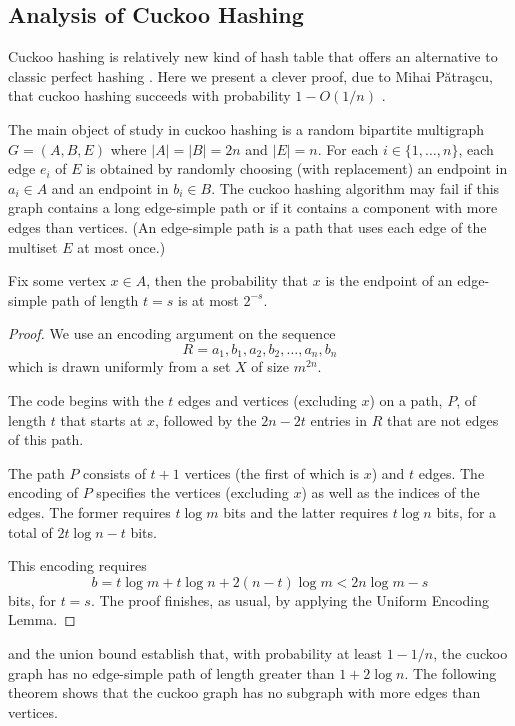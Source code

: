 \documentclass{patmorin}
\begin{document}
\subsection{Analysis of Cuckoo Hashing}

Cuckoo hashing is relatively new kind of hash table that offers an
alternative to classic perfect hashing \cite{pagh.rodler:cuckoo}. Here we present a clever proof,
due to Mihai Pătraşcu, that cuckoo hashing succeeds with probability
$1-O(1/n)$ \cite{patrascu:cuckoo}.

The main object of study in cuckoo hashing is a random bipartite
multigraph $G=(A,B,E)$ where $|A|=|B|=2n$ and $|E|=n$.  For each
$i\in\{1,\ldots,n\}$, each edge $e_i$ of $E$ is obtained by randomly
choosing (with replacement) an endpoint in $a_i\in A$ and an endpoint
in $b_i\in B$.  The cuckoo hashing algorithm may fail if this graph
contains a long edge-simple path or if it contains a component with more
edges than vertices.  (An edge-simple path is a path that uses each edge
of the multiset $E$ at most once.)

\begin{thm}
  Fix some vertex $x\in A$, then the probability that $x$ is the
  endpoint of an edge-simple path of length $t=s$ is at most $2^{-s}$.
\end{thm}

\begin{proof}
  We use an encoding argument on the sequence
  \[
     R=a_1,b_1,a_2,b_2,\ldots,a_n,b_n
  \]
  which is drawn uniformly from a set $X$ of size $m^{2n}$.

  The code begins with the $t$ edges and vertices (excluding $x$) on a
  path, $P$, of length $t$ that starts at $x$, followed by the $2n-2t$
  entries in $R$ that are not edges of this path.

  The path $P$ consists of $t+1$ vertices (the first of which is $x$) and
  $t$ edges. The encoding of $P$ specifies the vertices (excluding $x$)
  as well as the indices of the edges. The former requires $t\log m$ bits
  and the latter requires $t\log n$ bits, for a total of $2t\log n-t$ bits.

  This encoding requires
  \[
    b = t\log m + t\log n + 2(n-t)\log m < 2n\log m - s
  \]
  bits, for $t=s$. The proof finishes, as usual, by applying the
  Uniform Encoding Lemma.
\end{proof}

 and the union bound establish that, with probability
at least $1-1/n$, the cuckoo graph has no edge-simple path of length
greater than $1+2\log n$. The following theorem shows that the cuckoo
graph has no subgraph with more edges than vertices.
\end{document}
